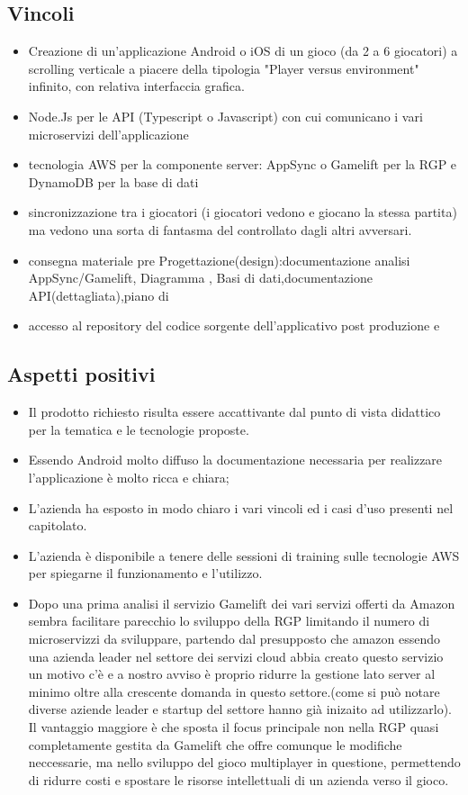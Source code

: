 \subsection{Vincoli}
\begin{itemize}
\item Creazione di un'applicazione Android o iOS di un gioco (da 2 a 6 giocatori) a scrolling verticale a piacere della tipologia "Player versus environment" infinito, con relativa interfaccia grafica.
\item Node.Js per le API (Typescript o Javascript) con cui comunicano i vari microservizi dell'applicazione
\item tecnologia AWS per la componente server: AppSync o Gamelift per la RGP e DynamoDB per la base di dati    
\item sincronizzazione  tra i giocatori (i giocatori vedono e giocano la stessa partita) ma vedono una sorta di fantasma del  controllato dagli altri avversari.
\item consegna materiale pre Progettazione(design):documentazione analisi AppSync/Gamelift, Diagramma  , Basi di dati,documentazione API(dettagliata),piano di 
\item accesso al repository del codice sorgente dell'applicativo post produzione e  
\end{itemize}

\subsection{Aspetti positivi}
\begin{itemize}
\item Il prodotto richiesto risulta essere accattivante dal punto di vista didattico per la tematica e le tecnologie proposte.
\item Essendo Android molto diffuso la documentazione necessaria per realizzare l'applicazione è molto ricca e chiara;
\item L'azienda ha esposto in modo chiaro i vari vincoli ed i casi d'uso presenti nel capitolato.
\item L'azienda \`e disponibile a tenere delle sessioni di training sulle tecnologie AWS per spiegarne il funzionamento e l'utilizzo.
\item Dopo una prima analisi il servizio Gamelift dei vari servizi offerti da Amazon sembra facilitare parecchio lo sviluppo della RGP limitando il numero di microservizzi da sviluppare, partendo dal
presupposto che amazon essendo una azienda leader nel settore dei servizi cloud abbia creato questo servizio un motivo c'è e a nostro avviso è proprio 
ridurre la gestione lato server al minimo oltre alla crescente domanda in questo settore.(come si può notare diverse aziende leader e startup del settore hanno già inizaito ad utilizzarlo).
Il vantaggio maggiore è che sposta il focus principale non nella RGP quasi completamente gestita da Gamelift che offre comunque le modifiche neccessarie, ma nello sviluppo del gioco multiplayer 
in questione, permettendo di ridurre costi e spostare le risorse intellettuali di un azienda verso il gioco.
\end{itemize}
